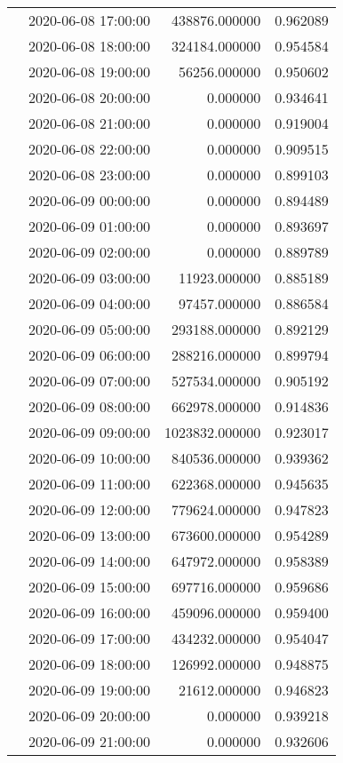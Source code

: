 \begin{tabular}{llrr}
 & 2020-06-08 17:00:00 & 438876.000000 & 0.962089 \\
 & 2020-06-08 18:00:00 & 324184.000000 & 0.954584 \\
 & 2020-06-08 19:00:00 & 56256.000000 & 0.950602 \\
 & 2020-06-08 20:00:00 & 0.000000 & 0.934641 \\
 & 2020-06-08 21:00:00 & 0.000000 & 0.919004 \\
 & 2020-06-08 22:00:00 & 0.000000 & 0.909515 \\
 & 2020-06-08 23:00:00 & 0.000000 & 0.899103 \\
 & 2020-06-09 00:00:00 & 0.000000 & 0.894489 \\
 & 2020-06-09 01:00:00 & 0.000000 & 0.893697 \\
 & 2020-06-09 02:00:00 & 0.000000 & 0.889789 \\
 & 2020-06-09 03:00:00 & 11923.000000 & 0.885189 \\
 & 2020-06-09 04:00:00 & 97457.000000 & 0.886584 \\
 & 2020-06-09 05:00:00 & 293188.000000 & 0.892129 \\
 & 2020-06-09 06:00:00 & 288216.000000 & 0.899794 \\
 & 2020-06-09 07:00:00 & 527534.000000 & 0.905192 \\
 & 2020-06-09 08:00:00 & 662978.000000 & 0.914836 \\
 & 2020-06-09 09:00:00 & 1023832.000000 & 0.923017 \\
 & 2020-06-09 10:00:00 & 840536.000000 & 0.939362 \\
 & 2020-06-09 11:00:00 & 622368.000000 & 0.945635 \\
 & 2020-06-09 12:00:00 & 779624.000000 & 0.947823 \\
 & 2020-06-09 13:00:00 & 673600.000000 & 0.954289 \\
 & 2020-06-09 14:00:00 & 647972.000000 & 0.958389 \\
 & 2020-06-09 15:00:00 & 697716.000000 & 0.959686 \\
 & 2020-06-09 16:00:00 & 459096.000000 & 0.959400 \\
 & 2020-06-09 17:00:00 & 434232.000000 & 0.954047 \\
 & 2020-06-09 18:00:00 & 126992.000000 & 0.948875 \\
 & 2020-06-09 19:00:00 & 21612.000000 & 0.946823 \\
 & 2020-06-09 20:00:00 & 0.000000 & 0.939218 \\
 & 2020-06-09 21:00:00 & 0.000000 & 0.932606 \\

\end{tabular}
